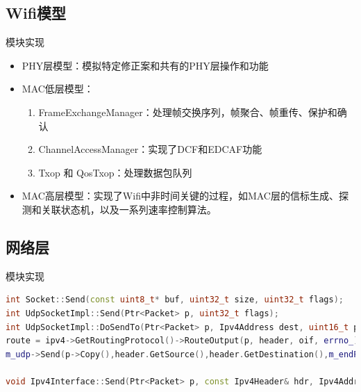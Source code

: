 \documentclass{beamer}
\begin{document}
\subsection{Wifi模型}
\begin{frame}{模块实现}
	\begin{itemize}
		\item PHY层模型：模拟特定修正案和共有的PHY层操作和功能
		\item MAC低层模型：
		      \begin{enumerate}
			      \item FrameExchangeManager：处理帧交换序列，帧聚合、帧重传、保护和确认
			      \item ChannelAccessManager：实现了DCF和EDCAF功能
			      \item Txop 和 QosTxop：处理数据包队列
		      \end{enumerate}
		\item MAC高层模型：实现了Wifi中非时间关键的过程，如MAC层的信标生成、探测和关联状态机，以及一系列速率控制算法。
	\end{itemize}
\end{frame}

\subsection{网络层}
\begin{frame}[fragile]{模块实现}
	\begin{lstlisting}[language=C++]
int Socket::Send(const uint8_t* buf, uint32_t size, uint32_t flags);
int UdpSocketImpl::Send(Ptr<Packet> p, uint32_t flags);
int UdpSocketImpl::DoSendTo(Ptr<Packet> p, Ipv4Address dest, uint16_t port, uint8_t tos);
route = ipv4->GetRoutingProtocol()->RouteOutput(p, header, oif, errno_);
m_udp->Send(p->Copy(),header.GetSource(),header.GetDestination(),m_endPoint->GetLocalPort(),port,route);

void Ipv4Interface::Send(Ptr<Packet> p, const Ipv4Header& hdr, Ipv4Address dest);
\end{lstlisting}
\end{frame}
\end{document}
